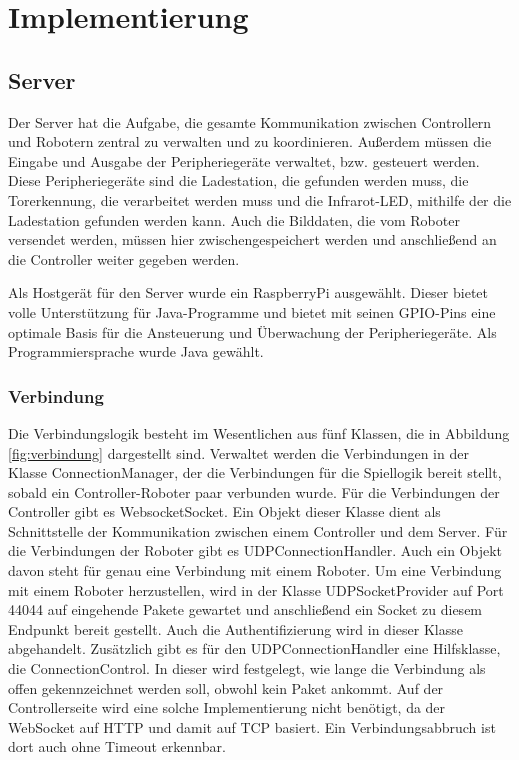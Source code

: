 \chapter{Implementierung}
\label{ch:implementierung}

\section{Server}
\label{impl:server}
Der Server hat die Aufgabe, die gesamte Kommunikation zwischen Controllern und Robotern zentral zu verwalten und zu koordinieren. Außerdem müssen die Eingabe und Ausgabe der Peripheriegeräte verwaltet, bzw. gesteuert werden. Diese Peripheriegeräte sind die Ladestation, die gefunden werden muss, die Torerkennung, die verarbeitet werden muss und die Infrarot-LED, mithilfe der die Ladestation gefunden werden kann. Auch die Bilddaten, die vom Roboter versendet werden, müssen hier zwischengespeichert werden und anschließend an die Controller weiter gegeben werden.

Als Hostgerät für den Server wurde ein RaspberryPi ausgewählt. Dieser bietet volle Unterstützung für Java-Programme und bietet mit seinen GPIO-Pins eine optimale Basis für die Ansteuerung und Überwachung der Peripheriegeräte. 
Als Programmiersprache wurde Java gewählt.


\subsection{Verbindung}
Die Verbindungslogik besteht im Wesentlichen aus fünf Klassen, die in Abbildung \ref{fig:verbindung} dargestellt sind. Verwaltet werden die Verbindungen in der Klasse ConnectionManager, der die Verbindungen für die Spiellogik bereit stellt, sobald ein Controller-Roboter paar verbunden wurde. Für die Verbindungen der Controller gibt es WebsocketSocket. Ein Objekt dieser Klasse dient als Schnittstelle der Kommunikation zwischen einem Controller und dem Server. Für die Verbindungen der Roboter gibt es UDPConnectionHandler. Auch ein Objekt davon steht für genau eine Verbindung mit einem Roboter. Um eine Verbindung mit einem Roboter herzustellen, wird in der Klasse UDPSocketProvider auf Port 44044 auf eingehende Pakete gewartet und anschließend ein Socket zu diesem Endpunkt bereit gestellt. Auch die Authentifizierung wird in dieser Klasse abgehandelt. Zusätzlich gibt es für den UDPConnectionHandler eine Hilfsklasse, die ConnectionControl. In dieser wird festgelegt, wie lange die Verbindung als offen gekennzeichnet werden soll, obwohl kein Paket ankommt. Auf der Controllerseite wird eine solche Implementierung nicht benötigt, da der WebSocket auf HTTP und damit auf TCP basiert. Ein Verbindungsabbruch ist dort auch ohne Timeout erkennbar.


